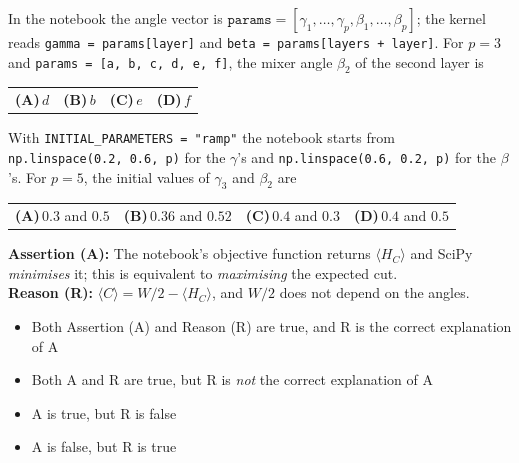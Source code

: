 \documentclass[11pt,a4paper]{article}
\newcommand{\optlabel}[1]{\textbf{(#1)}}
\newenvironment{qitem}[1]{\begin{list}{}{\setlength{\leftmargin}{3.3em}\setlength{\labelwidth}{3.1em}%
  \setlength{\labelsep}{0.2em}\setlength{\topsep}{3pt}\setlength{\parsep}{3pt}}\item[\textbf{Q.#1}\hfill]}{\end{list}}
\newcommand{\qsep}{\par\vspace{2pt}{\color{black!15}\hrule}\vspace{4pt}}
\begin{document}
\begin{qitem}{51}
In the notebook the angle vector is $\texttt{params} = [\gamma_1, \dots, \gamma_p, \beta_1, \dots, \beta_p]$; the kernel reads
\texttt{gamma = params[layer]} and \texttt{beta = params[layers + layer]}. For $p = 3$ and
\texttt{params = [a, b, c, d, e, f]}, the mixer angle $\beta_2$ of the second layer is
\par\smallskip\noindent\begin{tabularx}{\linewidth}{@{}*{4}{L}@{}}
\optlabel{A}\,$d$ & \optlabel{B}\,$b$ & \optlabel{C}\,$e$ & \optlabel{D}\,$f$
\end{tabularx}
\end{qitem}
\qsep

\begin{qitem}{52}
With \texttt{INITIAL\_PARAMETERS = "ramp"} the notebook starts from \texttt{np.linspace(0.2, 0.6, p)} for the $\gamma$'s and
\texttt{np.linspace(0.6, 0.2, p)} for the $\beta$'s. For $p = 5$, the initial values of $\gamma_3$ and $\beta_2$ are
\par\smallskip\noindent\begin{tabularx}{\linewidth}{@{}*{4}{L}@{}}
\optlabel{A}\,$0.3$ and $0.5$ & \optlabel{B}\,$0.36$ and $0.52$ & \optlabel{C}\,$0.4$ and $0.3$ & \optlabel{D}\,$0.4$ and $0.5$
\end{tabularx}
\end{qitem}
\qsep

\begin{qitem}{53}
\textbf{Assertion (A):} The notebook's objective function returns $\langle H_C\rangle$ and SciPy \emph{minimises} it; this is
equivalent to \emph{maximising} the expected cut.\\[1mm]
\textbf{Reason (R):} $\langle C\rangle = W/2 - \langle H_C\rangle$, and $W/2$ does not depend on the angles.
\begin{itemize}[leftmargin=2.6em, labelsep=0.4em, itemsep=2pt, topsep=3pt]
\item[\optlabel{A}] Both Assertion (A) and Reason (R) are true, and R is the correct explanation of A
\item[\optlabel{B}] Both A and R are true, but R is \emph{not} the correct explanation of A
\item[\optlabel{C}] A is true, but R is false
\item[\optlabel{D}] A is false, but R is true
\end{itemize}
\end{qitem}
\qsep
\end{document}
